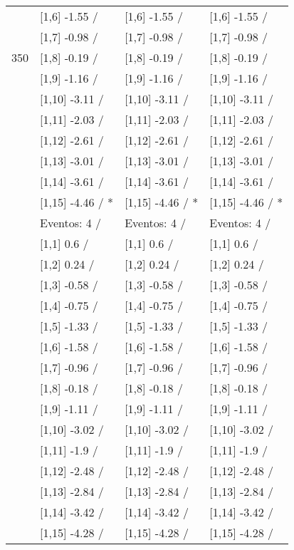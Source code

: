 \begin{table}
\begin{tabular}[t]{llll}
 & {}[1,6] -1.55  / & {}[1,6] -1.55  / & {}[1,6] -1.55  /\\
 & {}[1,7] -0.98  / & {}[1,7] -0.98  / & {}[1,7] -0.98  /\\
350 & {}[1,8] -0.19  / & {}[1,8] -0.19  / & {}[1,8] -0.19  /\\
\addlinespace
 & {}[1,9] -1.16  / & {}[1,9] -1.16  / & {}[1,9] -1.16  /\\
 & {}[1,10] -3.11  / & {}[1,10] -3.11  / & {}[1,10] -3.11  /\\
 & {}[1,11] -2.03  / & {}[1,11] -2.03  / & {}[1,11] -2.03  /\\
 & {}[1,12] -2.61  / & {}[1,12] -2.61  / & {}[1,12] -2.61  /\\
 & {}[1,13] -3.01  / & {}[1,13] -3.01  / & {}[1,13] -3.01  /\\
\addlinespace
 & {}[1,14] -3.61  / & {}[1,14] -3.61  / & {}[1,14] -3.61  /\\
 & {}[1,15] -4.46  / * & {}[1,15] -4.46  / * & {}[1,15] -4.46  / *\\
 & Eventos:  4 / & Eventos:  4 / & Eventos:  4 /\\
 & {}[1,1] 0.6  / & {}[1,1] 0.6  / & {}[1,1] 0.6  /\\
 & {}[1,2] 0.24  / & {}[1,2] 0.24  / & {}[1,2] 0.24  /\\
\addlinespace
 & {}[1,3] -0.58  / & {}[1,3] -0.58  / & {}[1,3] -0.58  /\\
 & {}[1,4] -0.75  / & {}[1,4] -0.75  / & {}[1,4] -0.75  /\\
 & {}[1,5] -1.33  / & {}[1,5] -1.33  / & {}[1,5] -1.33  /\\
 & {}[1,6] -1.58  / & {}[1,6] -1.58  / & {}[1,6] -1.58  /\\
 & {}[1,7] -0.96  / & {}[1,7] -0.96  / & {}[1,7] -0.96  /\\
\addlinespace
500 & {}[1,8] -0.18  / & {}[1,8] -0.18  / & {}[1,8] -0.18  /\\
 & {}[1,9] -1.11  / & {}[1,9] -1.11  / & {}[1,9] -1.11  /\\
 & {}[1,10] -3.02  / & {}[1,10] -3.02  / & {}[1,10] -3.02  /\\
 & {}[1,11] -1.9  / & {}[1,11] -1.9  / & {}[1,11] -1.9  /\\
 & {}[1,12] -2.48  / & {}[1,12] -2.48  / & {}[1,12] -2.48  /\\
\addlinespace
 & {}[1,13] -2.84  / & {}[1,13] -2.84  / & {}[1,13] -2.84  /\\
 & {}[1,14] -3.42  / & {}[1,14] -3.42  / & {}[1,14] -3.42  /\\
 & {}[1,15] -4.28  / & {}[1,15] -4.28  / & {}[1,15] -4.28  /\\
\bottomrule
\end{tabular}
\end{table}
